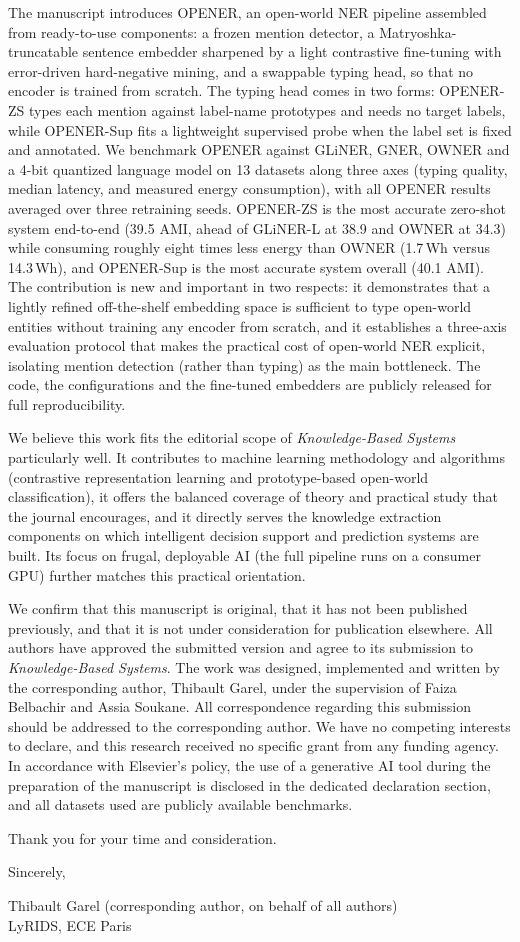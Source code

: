 \documentclass[11pt]{article}
\begin{document}
The manuscript introduces OPENER, an open-world NER pipeline assembled from ready-to-use components: a frozen mention detector, a Matryoshka-truncatable sentence embedder sharpened by a light contrastive fine-tuning with error-driven hard-negative mining, and a swappable typing head, so that no encoder is trained from scratch.
The typing head comes in two forms: OPENER-ZS types each mention against label-name prototypes and needs no target labels, while OPENER-Sup fits a lightweight supervised probe when the label set is fixed and annotated.
We benchmark OPENER against GLiNER, GNER, OWNER and a 4-bit quantized language model on 13 datasets along three axes (typing quality, median latency, and measured energy consumption), with all OPENER results averaged over three retraining seeds.
OPENER-ZS is the most accurate zero-shot system end-to-end (39.5 AMI, ahead of GLiNER-L at 38.9 and OWNER at 34.3) while consuming roughly eight times less energy than OWNER (1.7\,Wh versus 14.3\,Wh), and OPENER-Sup is the most accurate system overall (40.1 AMI).
The contribution is new and important in two respects: it demonstrates that a lightly refined off-the-shelf embedding space is sufficient to type open-world entities without training any encoder from scratch, and it establishes a three-axis evaluation protocol that makes the practical cost of open-world NER explicit, isolating mention detection (rather than typing) as the main bottleneck.
The code, the configurations and the fine-tuned embedders are publicly released for full reproducibility.

We believe this work fits the editorial scope of \textit{Knowledge-Based Systems} particularly well.
It contributes to machine learning methodology and algorithms (contrastive representation learning and prototype-based open-world classification), it offers the balanced coverage of theory and practical study that the journal encourages, and it directly serves the knowledge extraction components on which intelligent decision support and prediction systems are built.
Its focus on frugal, deployable AI (the full pipeline runs on a consumer GPU) further matches this practical orientation.

We confirm that this manuscript is original, that it has not been published previously, and that it is not under consideration for publication elsewhere.
All authors have approved the submitted version and agree to its submission to \textit{Knowledge-Based Systems}.
The work was designed, implemented and written by the corresponding author, Thibault Garel, under the supervision of Faiza Belbachir and Assia Soukane.
All correspondence regarding this submission should be addressed to the corresponding author.
We have no competing interests to declare, and this research received no specific grant from any funding agency.
In accordance with Elsevier's policy, the use of a generative AI tool during the preparation of the manuscript is disclosed in the dedicated declaration section, and all datasets used are publicly available benchmarks.

Thank you for your time and consideration.

\vspace{0.9em}

\noindent
Sincerely,

\vspace{0.4em}

\noindent
Thibault Garel (corresponding author, on behalf of all authors)\\
LyRIDS, ECE Paris
\end{document}
